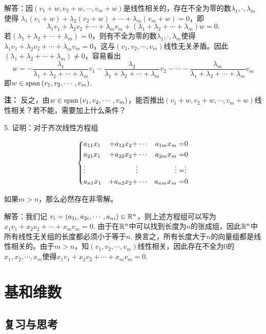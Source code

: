 \documentclass[hyperref,]{ctexart}
\begin{document}
\noindent{}
解答：因\((v_1+w,v_2+w,\cdots,v_m+w)\)是线性相关的，存在不全为零的数\(\lambda_1,\cdot,\lambda_m\)使得
\(\lambda_1(v_1+w)+\lambda_2(v_2+w)+\cdots +\lambda_m(v_m+w)=0\)，即
\[\lambda_1v_1+\lambda_2v_2+\cdots+\lambda_m v_m+(\lambda_1+\lambda_2+\cdots+\lambda_m)w=0.\]
若\((\lambda_1+\lambda_2+\cdots+\lambda_m)=0\)，则有不全为零的数\(\lambda_1,\cdot,\lambda_m\)使得\(\lambda_1v_1+\lambda_2v_2+\cdots+\lambda_m v_m=0\)，这与\((v_1,v_2,\cdots,v_m)\)线性无关矛盾。因此\((\lambda_1+\lambda_2+\cdots+\lambda_m)\ne 0\)，容易看出
\[w = -\frac{\lambda_1}{\lambda_1+\lambda_2+\cdots+\lambda_m}v_1-\frac{\lambda_2}{\lambda_1+\lambda_2+\cdots+\lambda_m}v_2-\cdots-\frac{\lambda_m}{\lambda_1+\lambda_2+\cdots+\lambda_m}v_m\]
即\(w\in\mathrm{span}\,(v_1,v_2,\cdots,v_m)\).

\noindent{} \textbf{注：}
反之，由\(w\in\mathrm{span}\,(v_1,v_2,\cdots,v_m)\)，能否推出\((v_1+w,v_2+w,\cdots,v_m+w)\)线性相关？若不能，需要加上什么条件？

\bigskip 

\noindent{} 5. 证明：对于齐次线性方程组

\begin{equation}
\left\{
\begin{aligned}
&a_{11}x_1&+a_{12}x_2+&\cdots &a_{1m}x_m = &0\\
&a_{21}x_1&+a_{22}x_2+&\cdots& a_{2m}x_m = &0\\
&\vdots&\vdots&&\vdots=&\vdots\\
&a_{n1}x_1&+a_{n2}x_2+&\cdots& a_{nm}x_m = &0\\
\end{aligned}\right.\notag
\end{equation}

如果\(m>n\)，那么必然存在非零解。

\noindent{} 解答：我们记
\(v_i = (a_{1i},a_{2i},\cdots,a_{ni})\in \mathbb{R}^n\)，则上述方程组可以写为\(x_1v_1+x_2v_2+\cdots+x_mv_m=0\).
由于在\(\mathbb{R}^n\)中可以找到长度为\(n\)的张成组，因此\(\mathbb{R}^n\)中所有线性无关组的长度都必须小于等于\(n\).
换言之，所有长度大于\(n\)的向量组都是线性相关的。由于\(m>n\)，知\((v_1,v_2,\cdots,v_m)\)线性相关，因此存在不全为\(0\)的\(x_1,x_2,\cdots,x_m\)使得\(x_1v_1+x_2v_2+\cdots+x_mv_m=0\).

\section{基和维数}\label{ux57faux548cux7ef4ux6570}

\subsection{复习与思考}\label{ux590dux4e60ux4e0eux601dux8003-2}
\end{document}
